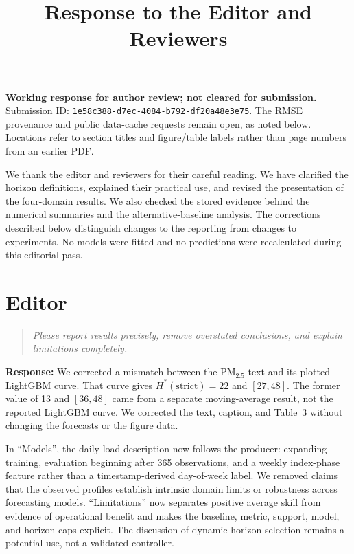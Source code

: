 \documentclass[11pt,a4paper]{article}
\title{\textbf{Response to the Editor and Reviewers}}
\author{}
\date{}
\newenvironment{reviewcomment}
  {\begin{quote}\itshape}
  {\end{quote}}
\newcommand{\response}{\noindent\textbf{Response:} }
\begin{document}
\maketitle
\textbf{Working response for author review; not cleared for submission.}
Submission ID: \texttt{1e58c388-d7ec-4084-b792-df20a48e3e75}.
The RMSE provenance and public data-cache requests remain open, as noted
below. Locations refer to section titles and figure/table labels rather
than page numbers from an earlier PDF.

We thank the editor and reviewers for their careful reading. We have
clarified the horizon definitions, explained their practical use, and
revised the presentation of the four-domain results. We also checked the
stored evidence behind the numerical summaries and the alternative-baseline
analysis. The corrections described below distinguish changes to the
reporting from changes to experiments. No models were fitted and no
predictions were recalculated during this editorial pass.


\section*{Editor}

\begin{reviewcomment}
Please report results precisely, remove overstated conclusions, and explain
limitations completely.
\end{reviewcomment}

\response
We corrected a mismatch between the PM$_{2.5}$ text and its plotted
LightGBM curve. That curve gives $H^*(\mathrm{strict})=22$ and $[27,48]$.
The former value of 13 and $[36,48]$ came from a separate moving-average
result, not the reported LightGBM curve. We corrected the text, caption,
and Table~3 without changing the forecasts or the figure data.

In ``Models'', the daily-load description now follows the producer:
expanding training, evaluation beginning after 365 observations, and a
weekly index-phase feature rather than a timestamp-derived day-of-week
label. We removed claims that the observed profiles establish intrinsic
domain limits or robustness across forecasting models. ``Limitations''
now separates positive average skill from evidence of operational benefit
and makes the baseline, metric, support, model, and horizon caps explicit.
The discussion of dynamic horizon selection remains a potential use,
not a validated controller.
\end{document}
